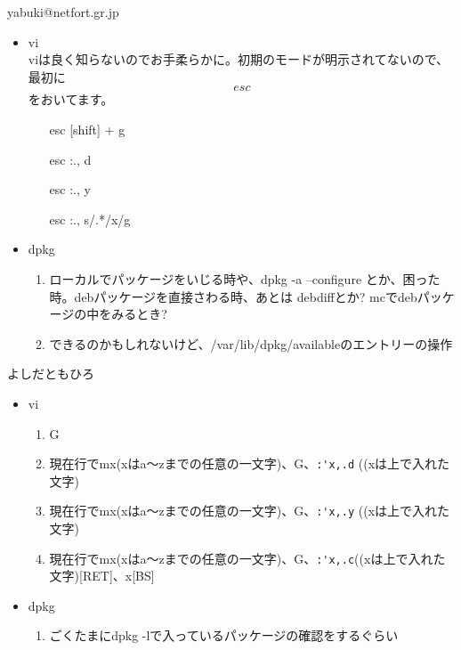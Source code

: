 \documentclass[mingoth,a4paper]{jsarticle}
\begin{document}
\begin{prework}{ yabuki@netfort.gr.jp }
  \begin{itemize}
  \item vi \\viは良く知らないのでお手柔らかに。初期のモードが明示されてないので、最初に\[esc\]をおいてます。
    \begin{enumerate}
    \item [esc][shift] + g
    \item [esc]:., \textdollar d
    \item [esc]:., \textdollar y
    \item [esc]:., \textdollar s/.*/x/g
    \end{enumerate}
  \item dpkg
    \begin{enumerate}
    \item ローカルでパッケージをいじる時や、dpkg -a --configure とか、困った時。debパッケージを直接さわる時、あとは debdiffとか? mcでdebパッケージの中をみるとき?
    \item できるのかもしれないけど、/var/lib/dpkg/availableのエントリーの操作
    \end{enumerate}
  \end{itemize}
\end{prework}

\begin{prework}{ よしだともひろ }
  \begin{itemize}
  \item vi
    \begin{enumerate}
    \item G
    \item 現在行でmx(xはa〜zまでの任意の一文字)、G、\verb+:'x,.d+ ((xは上で入れた文字)
    \item 現在行でmx(xはa〜zまでの任意の一文字)、G、\verb+:'x,.y+ ((xは上で入れた文字)
    \item 現在行でmx(xはa〜zまでの任意の一文字)、G、\verb+:'x,.c+((xは上で入れた文字)[RET]、x[BS]
    \end{enumerate}
  \item dpkg
    \begin{enumerate}
    \item ごくたまにdpkg -lで入っているパッケージの確認をするぐらい
    \end{enumerate}
  \end{itemize}
\end{prework}
\end{document}
